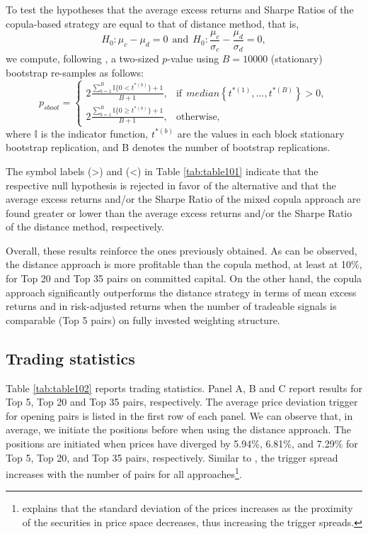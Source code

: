 \documentclass[a4paper,12pt]{report}
\begin{document}
\begin{refsection}
	To test the hypotheses that the average excess returns and Sharpe Ratios of the copula-based strategy are equal to that of distance method, that is,
	\begin{equation}
	H_{0}:\mu_{c}-\mu_{d}=0  \ \ \textrm{and}
	\ \  H_{0}:\frac{\mu_{c}}{\sigma_{c}}-\frac{\mu_{d}}{\sigma_{d}}=0,
	\label{eq:eq153}
	\end{equation}
	we compute, following \citet*{davison1997}, a two-sized $p$-value using $B=10000$ (stationary) bootstrap re-samples as follows:
	\begin{equation}
	p_{sboot}=
	\begin{cases}
	2\frac{\sum_{b=1}^{B}\mathbb{I}\{0< t^{\ast(b)}\}+1}{B+1}, &\text{if} ~~median\left\{ t^{\ast \left( 1\right) },...,t^{\ast \left( B\right)}\right\} > 0, \\
	2\frac{\sum_{b=1}^{B}\mathbb{I}\{0\geq t^{\ast(b)}\}+1}{B+1}, &\text{otherwise},
	\end{cases}
	\label{eq:eq152}
	\end{equation}
	where $\mathbb{I}$ is the indicator function, $t^{\ast(b)}$ are the values in each block stationary bootstrap replication, and B denotes the number of bootstrap replications.
	
	The symbol labels (>) and (<) in Table \ref{tab:table101} indicate that the respective null hypothesis is rejected in favor of the alternative and that the average excess returns and/or the Sharpe Ratio of the mixed copula approach are found greater or lower than the average excess returns and/or the Sharpe Ratio of the distance method, respectively.
	
	Overall, these results reinforce the ones previously obtained. As can be observed, the distance approach is more profitable than the copula method, at least at 10\%, for Top 20 and Top 35 pairs on committed capital. On the other hand, the copula approach significantly outperforms the distance strategy in terms of mean excess returns and in risk-adjusted returns when the number of tradeable signals is comparable (Top 5 pairs) on fully invested weighting structure.

\vspace{1.0cm}
	
	\subsection{Trading statistics}
	
Table \ref{tab:table102} reports trading statistics. Panel A, B and C report results for Top 5, Top 20 and Top 35 pairs, respectively. The average price deviation trigger for opening pairs is listed in the first row of each panel. We can observe that, in average, we initiate the positions before when using the distance approach. The positions are initiated when prices have diverged by 5.94\%, 6.81\%, and 7.29\% for Top 5, Top 20, and Top 35 pairs, respectively. Similar to \citet*{ggr06}, the trigger spread increases with the number of pairs for all approaches\footnote{\citet*{ggr06} explains that the standard deviation of the prices increases as the proximity of the securities in price space decreases, thus increasing the trigger spreads.}.


\end{refsection}
\end{document}

